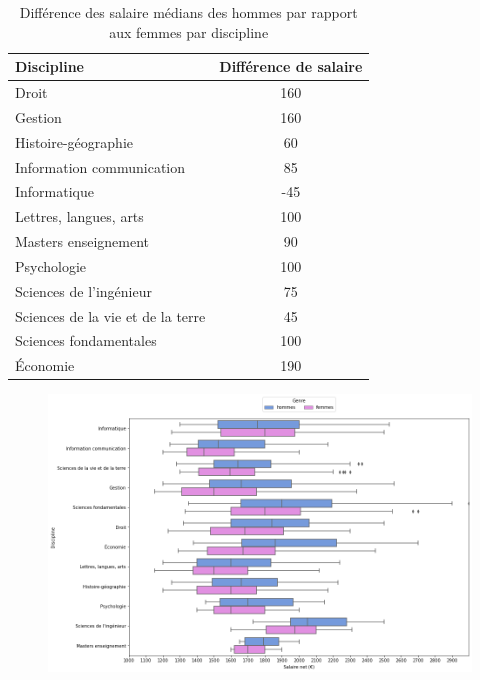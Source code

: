 \documentclass[12pt, a4paper, titlepage, table]{article}
\begin{document}
	\begin{table}[H]
		\centering
		\begin{tabular}{lc}
			\toprule
			\textbf{Discipline} & \textbf{Différence de salaire} \\
			\midrule
			Droit & 160 \\
			Gestion & 160 \\
			Histoire-géographie & 60 \\
			Information communication & 85 \\
			Informatique & -45 \\
			Lettres, langues, arts & 100 \\
			Masters enseignement & 90 \\
			Psychologie & 100 \\
			Sciences de l'ingénieur & 75 \\
			Sciences de la vie et de la terre & 45 \\
			Sciences fondamentales & 100 \\
			Économie & 190 \\
			\bottomrule
		\end{tabular}
		\caption{Différence des salaire médians des hommes par rapport aux femmes par discipline}
		\label{tab:diff_salaire_genre}
	\end{table}
	

	\begin{figure}[H]
		\centering
		\includegraphics[width=1\textwidth]{../graphs/boxplot_salaire_discipline.png}
		\label{fig:boxplot_salaire_discipline}
	\end{figure} 
\end{document}
